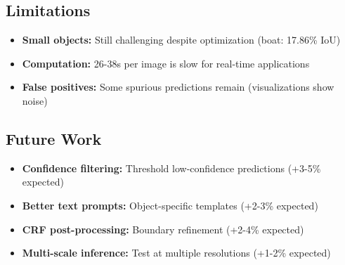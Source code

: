 \subsection{Limitations}

\begin{itemize}
    \item \textbf{Small objects:} Still challenging despite optimization (boat: 17.86\% IoU)
    \item \textbf{Computation:} 26-38s per image is slow for real-time applications
    \item \textbf{False positives:} Some spurious predictions remain (visualizations show noise)
\end{itemize}

\subsection{Future Work}

\begin{itemize}
    \item \textbf{Confidence filtering:} Threshold low-confidence predictions (+3-5\% expected)
    \item \textbf{Better text prompts:} Object-specific templates (+2-3\% expected)
    \item \textbf{CRF post-processing:} Boundary refinement (+2-4\% expected)
    \item \textbf{Multi-scale inference:} Test at multiple resolutions (+1-2\% expected)
\end{itemize}









